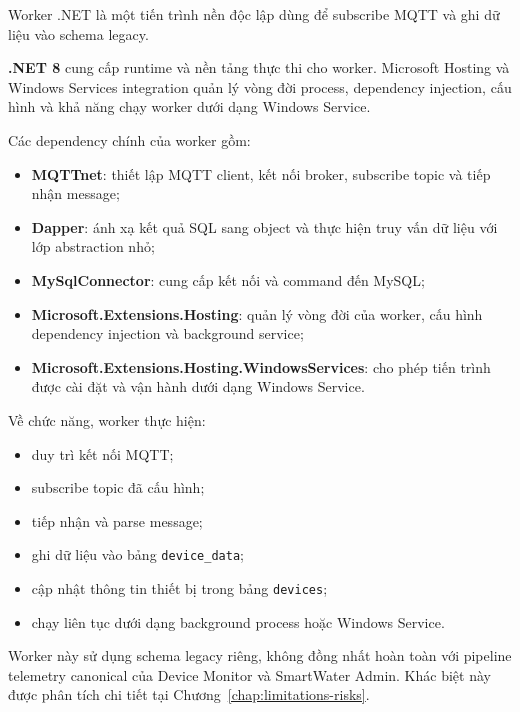 Worker .NET là một tiến trình nền độc lập dùng để subscribe MQTT và ghi dữ liệu
vào schema legacy.

\textbf{.NET 8} cung cấp runtime và nền tảng thực thi cho worker.
Microsoft Hosting và Windows Services integration quản lý vòng đời process,
dependency injection, cấu hình và khả năng chạy worker dưới dạng Windows
Service.

Các dependency chính của worker gồm:

\begin{itemize}
    \item \textbf{MQTTnet}: thiết lập MQTT client, kết nối broker, subscribe
    topic và tiếp nhận message;

    \item \textbf{Dapper}: ánh xạ kết quả SQL sang object và thực hiện truy vấn
    dữ liệu với lớp abstraction nhỏ;

    \item \textbf{MySqlConnector}: cung cấp kết nối và command đến MySQL;

    \item \textbf{Microsoft.Extensions.Hosting}: quản lý vòng đời của worker,
    cấu hình dependency injection và background service;

    \item \textbf{Microsoft.Extensions.Hosting.WindowsServices}: cho phép tiến
    trình được cài đặt và vận hành dưới dạng Windows Service.
\end{itemize}

Về chức năng, worker thực hiện:

\begin{itemize}
    \item duy trì kết nối MQTT;
    \item subscribe topic đã cấu hình;
    \item tiếp nhận và parse message;
    \item ghi dữ liệu vào bảng \texttt{device\_data};
    \item cập nhật thông tin thiết bị trong bảng \texttt{devices};
    \item chạy liên tục dưới dạng background process hoặc Windows Service.
\end{itemize}

Worker này sử dụng schema legacy riêng, không đồng nhất hoàn toàn với pipeline
telemetry canonical của Device Monitor và SmartWater Admin. Khác biệt này được
phân tích chi tiết tại Chương~\ref{chap:limitations-risks}.

